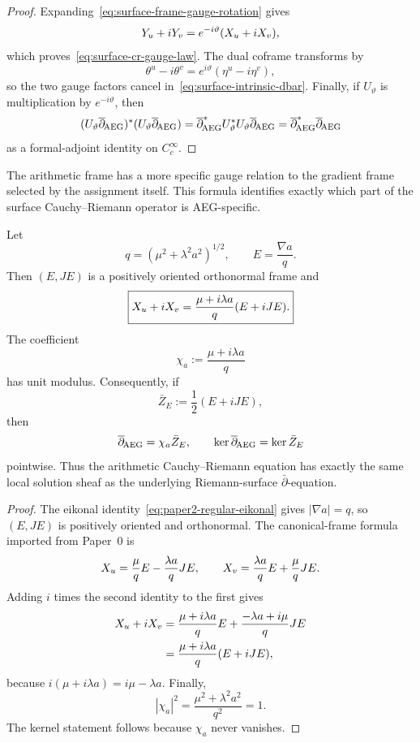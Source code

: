 \begin{proof}
Expanding~\eqref{eq:surface-frame-gauge-rotation} gives
\[
 Y_u+iY_v
 =e^{-i\vartheta}(X_u+iX_v),
\]
which proves~\eqref{eq:surface-cr-gauge-law}.  The dual coframe transforms by
\[
 \theta^u-i\theta^v
 =e^{i\vartheta}(\eta^u-i\eta^v),
\]
so the two gauge factors cancel in~\eqref{eq:surface-intrinsic-dbar}.  Finally,
if $U_\vartheta$ is multiplication by $e^{-i\vartheta}$, then
\[
 (U_\vartheta\overline\partial_{\!\mathrm{AEG}})^*(U_\vartheta\overline\partial_{\!\mathrm{AEG}})
 =\overline\partial_{\!\mathrm{AEG}}^*U_\vartheta^*U_\vartheta\overline\partial_{\!\mathrm{AEG}}
 =\overline\partial_{\!\mathrm{AEG}}^*\overline\partial_{\!\mathrm{AEG}}
\]
as a formal-adjoint identity on $C_c^\infty$.
\end{proof}

The arithmetic frame has a more specific gauge relation to the gradient frame
selected by the assignment itself.  This formula identifies exactly which part
of the surface Cauchy--Riemann operator is AEG-specific.

\begin{proposition}
\label{prop:surface-assignment-unitary-gauge}
Let
\begin{equation}\label{eq:surface-gradient-unit-vector}
 q=(\mu^2+\lambda^2a^2)^{1/2},
 \qquad
 E=\frac{\nabla a}{q}.
\end{equation}
Then $(E,JE)$ is a positively oriented orthonormal frame and
\begin{equation}\label{eq:surface-assignment-frame-complex-gauge}
 \boxed{
 X_u+iX_v
 =\frac{\mu+i\lambda a}{q}(E+iJE).
 }
\end{equation}
The coefficient
\begin{equation}\label{eq:surface-assignment-u1-factor}
 \chi_a:=\frac{\mu+i\lambda a}{q}
\end{equation}
has unit modulus.  Consequently, if
\[
 \bar Z_E:=\frac12(E+iJE),
\]
then
\begin{equation}\label{eq:surface-assignment-dbar-gauge}
 \overline\partial_{\!\mathrm{AEG}}=\chi_a\bar Z_E,
 \qquad
 \ker\overline\partial_{\!\mathrm{AEG}}=\ker\bar Z_E
\end{equation}
pointwise.  Thus the arithmetic Cauchy--Riemann equation has exactly the same
local solution sheaf as the underlying Riemann-surface
$\bar\partial$-equation.
\end{proposition}

\begin{proof}
The eikonal identity~\eqref{eq:paper2-regular-eikonal} gives
$|\nabla a|=q$, so $(E,JE)$ is positively oriented and orthonormal.  The
canonical-frame formula imported from Paper~0 is
\[
 X_u=\frac{\mu}{q}E-\frac{\lambda a}{q}JE,
 \qquad
 X_v=\frac{\lambda a}{q}E+\frac{\mu}{q}JE.
\]
Adding $i$ times the second identity to the first gives
\begin{align*}
 X_u+iX_v
 &=\frac{\mu+i\lambda a}{q}E
   +\frac{-\lambda a+i\mu}{q}JE\\
 &=\frac{\mu+i\lambda a}{q}(E+iJE),
\end{align*}
because $i(\mu+i\lambda a)=i\mu-\lambda a$.  Finally,
\[
 |\chi_a|^2
 =\frac{\mu^2+\lambda^2a^2}{q^2}=1.
\]
The kernel statement follows because $\chi_a$ never vanishes.
\end{proof}

